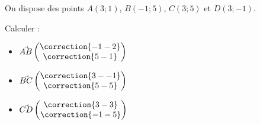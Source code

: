 \documentclass{automatisme}
\begin{document}
\begin{frame}
	On dispose des points $A(3 ; 1)$, $B(-1 ; 5)$, $C(3 ; 5)$ et $D(3 ; -1)$.

	Calculer :

	\begin{itemize}
		\item $\vec{AB}\begin{pmatrix}\correction{-1 - 2} \\ \correction{5 - 1}\end{pmatrix}$
		\item $\vec{BC}\begin{pmatrix}\correction{3 - -1} \\ \correction{5 - 5}\end{pmatrix}$
		\item $\vec{CD}\begin{pmatrix}\correction{3 - 3} \\ \correction{-1 - 5}\end{pmatrix}$
	\end{itemize}
\end{frame}
\end{document}
